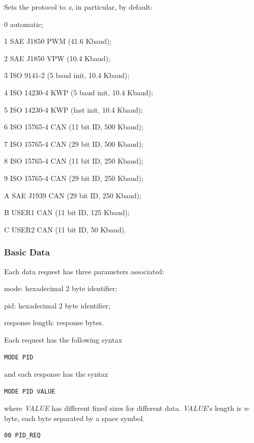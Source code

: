 \documentclass[twoside]{article}
\begin{document}
\begin{multicols}{2}
Sets the protocol to \emph{x}, in particular, by default:
\begin{compactitem}
  \item 0 automatic;
  \item 1 SAE J1850 PWM (41.6 Kbaud);
  \item 2 SAE J1850 VPW (10.4 Kbaud);
  \item 3 ISO 9141-2 (5 baud init, 10.4 Kbaud);
  \item 4 ISO 14230-4 KWP (5 baud init, 10.4 Kbaud);
  \item 5 ISO 14230-4 KWP (fast init, 10.4 Kbaud);
  \item 6 ISO 15765-4 CAN (11 bit ID, 500 Kbaud);
  \item 7 ISO 15765-4 CAN (29 bit ID, 500 Kbaud);
  \item 8 ISO 15765-4 CAN (11 bit ID, 250 Kbaud);
  \item 9 ISO 15765-4 CAN (29 bit ID, 250 Kbaud);
  \item A SAE J1939 CAN (29 bit ID, 250 Kbaud);
  \item B USER1 CAN (11 bit ID, 125 Kbaud);
  \item C USER2 CAN (11 bit ID, 50 Kbaud).
\end{compactitem}

\subsubsection{Basic Data}

Each data request has three parameters associated:
\begin{compactitem}
  \item mode: hexadecimal 2 byte identifier;
  \item pid: hexadecimal 2 byte identifier;
  \item response length: response bytes.
\end{compactitem}

Each request has the following syntax
\begin{lstlisting}[language=bash]
MODE PID
\end{lstlisting}
and each response has the syntax
\begin{lstlisting}[language=bash]
MODE PID VALUE
\end{lstlisting}
where \emph{VALUE} has different fixed sizes for different data.
\emph{VALUE}'s length is \emph{n}-byte, each byte separated by a space symbol.

\begin{lstlisting}[language=bash]
00 PID_REQ
\end{lstlisting}


\end{multicols}
\end{document}
